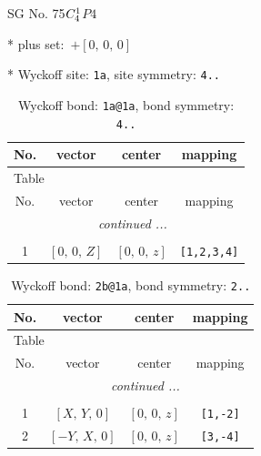 \documentclass[fleqn,8pt]{jsarticle}
\begin{document}
\setcounter{MaxMatrixCols}{32}

\renewcommand{\tablename}{Table~}
\renewcommand{\figurename}{Figure~}
\begin{center}
\LARGE
SG No. 75\quad$C_{\rm 4}^{1}$\quad$P4$\quad[ tetragonal ]
\end{center}

* plus set:\,\,\,$+\left[ 0,\, 0,\, 0 \right]$


* Wyckoff site: {\tt 1a}, site symmetry: {\tt 4..}
\renewcommand{\arraystretch}{1.2}
\begin{longtable}{cccc}
\caption{Wyckoff bond: {\tt 1a@1a}, bond symmetry: {\tt 4..}}
 \\
 \hline \hline
No. & vector & center & mapping \\ \hline \endfirsthead

\multicolumn{3}{l}{\tablename\ \thetable{}} \\
 \hline \hline
No. & vector & center & mapping \\ \hline \endhead

 \hline \hline
\multicolumn{3}{r}{\footnotesize\it continued ...} \\ \endfoot

 \hline \hline
\multicolumn{3}{r}{} \\ \endlastfoot

1 & $\left[ 0,\, 0,\, Z \right]$ & $\left[ 0,\, 0,\, z \right]$ & {\tt [1,2,3,4]} \\
\end{longtable}
\renewcommand{\arraystretch}{1.2}
\begin{longtable}{cccc}
\caption{Wyckoff bond: {\tt 2b@1a}, bond symmetry: {\tt 2..}}
 \\
 \hline \hline
No. & vector & center & mapping \\ \hline \endfirsthead

\multicolumn{3}{l}{\tablename\ \thetable{}} \\
 \hline \hline
No. & vector & center & mapping \\ \hline \endhead

 \hline \hline
\multicolumn{3}{r}{\footnotesize\it continued ...} \\ \endfoot

 \hline \hline
\multicolumn{3}{r}{} \\ \endlastfoot

1 & $\left[ X,\, Y,\, 0 \right]$ & $\left[ 0,\, 0,\, z \right]$ & {\tt [1,-2]} \\ \hline
2 & $\left[ - Y,\, X,\, 0 \right]$ & $\left[ 0,\, 0,\, z \right]$ & {\tt [3,-4]} \\
\end{longtable}
\end{document}
